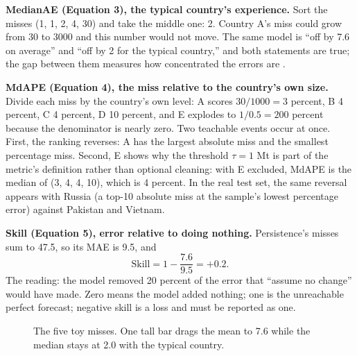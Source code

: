 \documentclass[11pt]{article}
\begin{document}
\textbf{MedianAE (Equation 3), the typical country's experience.}
Sort the misses (1, 1, 2, 4, 30) and take the middle one: 2. Country A's
miss could grow from 30 to 3000 and this number would not move. The same
model is ``off by 7.6 on average'' and ``off by 2 for the typical
country,'' and both statements are true; the gap between them measures
how concentrated the errors are \cite{hyndman2006another}.

\textbf{MdAPE (Equation 4), the miss relative to the country's own size.}
Divide each miss by the country's own level: A scores $30/1000 = 3$
percent, B 4 percent, C 4 percent, D 10 percent, and E explodes to
$1/0.5 = 200$ percent because the denominator is nearly zero. Two
teachable events occur at once. First, the ranking reverses: A has the
largest absolute miss and the smallest percentage miss. Second, E shows
why the threshold $\tau = 1$ Mt is part of the metric's definition rather
than optional cleaning: with E excluded, MdAPE is the median of (3, 4, 4,
10), which is 4 percent. In the real test set, the same reversal appears
with Russia (a top-10 absolute miss at the sample's lowest percentage
error) against Pakistan and Vietnam.

\textbf{Skill (Equation 5), error relative to doing nothing.}
Persistence's misses sum to 47.5, so its MAE is 9.5, and
\[
\mathrm{Skill} = 1 - \frac{7.6}{9.5} = +0.2 .
\]
The reading: the model removed 20 percent of the error that ``assume no
change'' would have made. Zero means the model added nothing; one is the
unreachable perfect forecast; negative skill is a loss and must be
reported as one.

\begin{figure}[ht]
\centering
{}
\caption{The five toy misses. One tall bar drags the mean to 7.6 while the
median stays at 2.0 with the typical country.}
\label{fig:metrics}
\end{figure}
\end{document}
